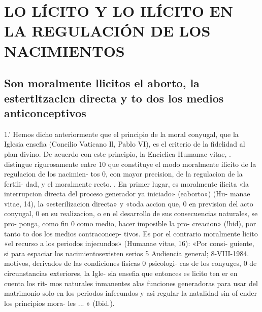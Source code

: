 \documentclass[letterpaper]{report}
\begin{document}
	{\centering
		\section{LO L\'ICITO Y LO IL\'ICITO EN LA REGULACI\'ON DE LOS NACIMIENTOS}
	}
		\subsection{Son moralmente llicitos el aborto, la estertltzaclcn 
		directa y to dos los medios anticonceptivos}
			1.' Hemos dicho anteriormente que el principio de la 
			moral conyugal, que la Iglesia ensefia (Concilio Vaticano 
			Il, Pablo VI), es el criterio de la fidelidad al plan divino. 
			De acuerdo con este principio, la Enciclica Humanae 
			vitae, . distingue rigurosamente entre 10 que constituye el 
			modo moralmente ilicito de la regulacion de los nacimien- 
			tos 0, con mayor precision, de la regulacion de la fertili- 
			dad, y el moralmente recto. 	. 
			En primer lugar, es moralmente ilicita «la interrupcion 
			directa del proceso generador ya iniciado» (eaborto») (Hu- 
			manae vitae, 14), la «esterilizacion directa» y «toda accion 
			que, 0 en prevision del acto conyugal, 0 en su realizacion, 
			o en el desarrollo de sus consecuencias naturales, se pro- 
			ponga, como fin 0 como medio, hacer imposible la pro- 
			creacion» (!bid), por tanto to dos los medios contraconcep- 
			tivos. Es por el contrario moralmente licito «el recurso a 
			los periodos injecundos» (Humanae vitae, 16): «Por consi- 
			guiente, si para espaciar los nacimientosexisten serios 
			5 Audiencia general; 8-VIII-1984. 
			motivos, derivados de las condiciones fisicas 0 psicologi- 
			cas de los conyuges, 0 de circunstancias exteriores, la Igle- 
			sia ensefia que entonces es licito ten er en cuenta los rit- 
			mos naturales inmanentes alas funciones generadoras 
			para usar del matrimonio solo en los periodos infecundos 
			y asi regular la natalidad sin of ender los principios mora- 
			les ... » (Ibid.). 
		
\end{document}
